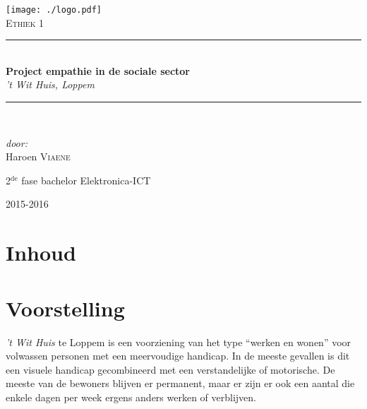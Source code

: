 \documentclass[a4paper,12pt]{article}
\newcommand{\HRule}{\rule{\linewidth}{0.5mm}}
\begin{document}
\begin{titlepage}
\begin{center}
\texttt{[image: ./logo.pdf]}~\\[1cm]


\textsc{\Large Ethiek 1}\\[0.5cm]

\HRule \\[0.4cm]
{ \LARGE \bfseries Project empathie in de sociale sector}\\[0.4cm]
{\large \emph{'t Wit Huis, Loppem}}\\[0.2cm]

\HRule \\[1.5cm]

\begin{minipage}{0.4\textwidth}
\begin{flushleft} \large
\emph{door:}\\
Haroen \textsc{Viaene}\\

\end{flushleft}
\end{minipage}
\begin{minipage}{0.4\textwidth}
\begin{flushright} \large
\large{2$^{\text{de}}$ fase bachelor Elektronica-ICT}\\
\end{flushright}
\end{minipage}

\vfill

{\large 2015-2016}

\end{center}
\end{titlepage}

\newpage

\section*{Inhoud}

\tableofcontents

\newpage

\section{Voorstelling}

\emph{’t Wit Huis} te Loppem is een voorziening van het type ``werken en wonen'' voor volwassen personen met een meervoudige handicap. In de meeste gevallen is dit een visuele handicap gecombineerd met een verstandelijke of motorische. De meeste van de bewoners blijven er permanent, maar er zijn er ook een aantal die enkele dagen per week ergens anders werken of verblijven.
\end{document}
